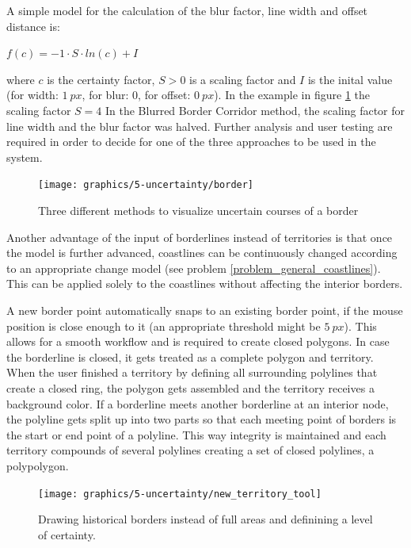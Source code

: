 A simple model for the calculation of the blur factor, line width and offset distance is:
\begin{center}
\begin{math}
    f(c) = -1 \cdot S \cdot ln(c) + I
\end{math}
\end{center}
where $c$ is the certainty factor, $S>0$ is a scaling factor and $I$ is the inital value (for width: $1~px$, for blur: $0$, for offset: $0~px$). In the example in figure \ref{fig:uncertainty_border} the scaling factor $S=4$ In the Blurred Border Corridor method, the scaling factor for line width and the blur factor was halved. Further analysis and user testing are required in order to decide for one of the three approaches to be used in the system.

\begin{figure}[H]
  \centering
  \texttt{[image: graphics/5-uncertainty/border]}
  \caption{Three different methods to visualize uncertain courses of a border}
  \label{fig:uncertainty_border}
\end{figure}

Another advantage of the input of borderlines instead of territories is that once the model is further advanced, coastlines can be continuously changed according to an appropriate change model (see problem \ref{problem_general_coastlines}). This can be applied solely to the coastlines without affecting the interior borders.

A new border point automatically snaps to an existing border point, if the mouse position is close enough to it (an appropriate threshold might be $5~px$). This allows for a smooth workflow and is required to create closed polygons. In case the borderline is closed, it gets treated as a complete polygon and territory. When the user finished a territory by defining all surrounding polylines that create a closed ring, the polygon gets assembled and the territory receives a background color. If a borderline meets another borderline at an interior node, the polyline gets split up into two parts so that each meeting point of borders is the start or end point of a polyline. This way integrity is maintained and each territory compounds of several polylines creating a set of closed polylines, a polypolygon.

\begin{figure}[ht]
  \centering
  \texttt{[image: graphics/5-uncertainty/new\_territory\_tool]}
  \caption{Drawing historical borders instead of full areas and definining a level of certainty.}
  \label{fig:uncertainty_new_territory_tool}
\end{figure}


